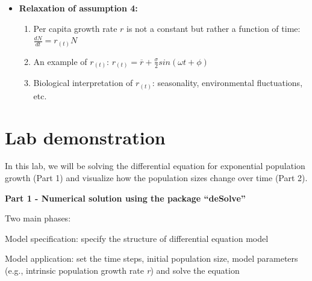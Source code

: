 \documentclass[
]{book}
\providecommand{\tightlist}{%
  \setlength{\itemsep}{0pt}\setlength{\parskip}{0pt}}
\begin{document}
\begin{itemize}
\tightlist
\item
  \textbf{Relaxation of assumption 4:}

  \begin{enumerate}
  \def\labelenumi{\arabic{enumi}.}
  \tightlist
  \item
    Per capita growth rate \(r\) is not a constant but rather a function of time: \(\frac{dN}{dt} = r_{(t)}N\)
  \item
    An example of \(r_{(t)}\): \(r_{(t)} = \overline{r} + \frac{\sigma}{2}sin(\omega t + \phi)\)
  \item
    Biological interpretation of \(r_{(t)}\): seasonality, environmental fluctuations, etc.
  \end{enumerate}
\end{itemize}

\hypertarget{lab-demonstration-1}{%
\section*{Lab demonstration}\label{lab-demonstration-1}}

In this lab, we will be solving the differential equation for exponential population growth (Part 1) and visualize how the population sizes change over time (Part 2).

\textbf{Part 1 - Numerical solution using the package ``deSolve''}

Two main phases:

\protect\hypertarget{aaa}{}{Model specification: specify the structure of differential equation model}

\protect\hypertarget{bbb}{}{Model application: set the time steps, initial population size, model parameters (e.g., intrinsic population growth rate \emph{r}) and solve the equation}
\end{document}
